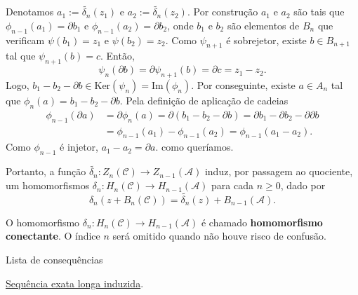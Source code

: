     Denotamos $a_1:=\tilde{\delta_n} (z_1)$ e $a_2:=\tilde{\delta_n}(z_2)$. Por construção $a_1$ e $a_2$ são tais que $\phi_{n-1}(a_1)=\partial b_1$ e $\phi_{n-1}(a_2)=\partial b_2$, onde $b_1$ e $b_2$ são elementos de $B_n$ que verificam $\psi(b_1)=z_1$ e $\psi(b_2)=z_2$. Como $\psi_{n+1}$ é sobrejetor, existe $b\in B_{n+1}$ tal que $\psi_{n+1}(b)=c$. Então, 
    \[\psi_n(\partial b)=\partial \psi_{n+1}(b)=\partial c=z_1-z_2.\]
    Logo, $b_1-b_2-\partial b\in \text{Ker}(\psi_n)=\text{Im}(\phi_n)$. Por conseguinte, existe $a\in A_n$ tal que $\phi_n(a)=b_1-b_2-\partial b$. Pela definição de aplicação de cadeias 
    \begin{align*}
        \phi_{n-1}(\partial a)&=\partial\phi_n(a)=\partial(b_1-b_2-\partial b)=\partial b_1-\partial b_2-\partial\partial b\\
        &=\phi_{n-1}(a_1)-\phi_{n-1}(a_2)=\phi_{n-1}(a_1-a_2).
    \end{align*}
    Como $\phi_{n-1}$ é injetor, $a_1-a_2=\partial a$. como queríamos.

    Portanto, a função $\tilde{\delta_n}:Z_n(\mathcal{C})\rightarrow Z_{n-1}(\mathcal{A})$ induz, por passagem ao quociente, um homomorfismos $\delta_n:H_n(\mathcal{C})\rightarrow H_{n-1}(\mathcal{A})$ para cada $n\ge 0$, dado por 
    \[\delta_n (z+B_n(\mathcal{C}))=\tilde{\delta_n}(z)+B_{n-1}(\mathcal{A}).\]
    \begin{defi}
        O homomorfismo $\delta_n:H_n(\mathcal{C})\rightarrow H_{n-1}(\mathcal{A})$ é chamado \textbf{homomorfismo conectante}. O índice $n$ será omitido quando não houve risco de confusão.
    \end{defi}
\begin{titlemize}{Lista de consequências}
    \item \hyperref[sequencia-exata-longa-induzida-prop]{Sequência exata longa induzida}.\\
\end{titlemize}
